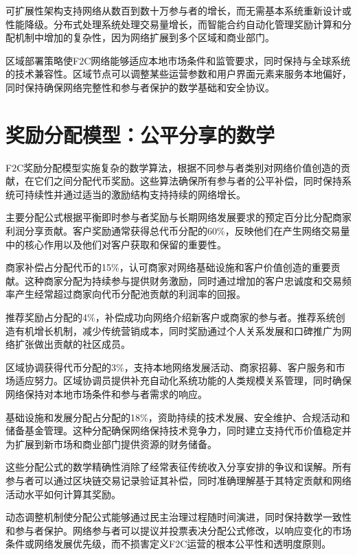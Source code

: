 \documentclass[
  Letterpaper,
]{scrbook}
\begin{document}
可扩展性架构支持网络从数百到数十万参与者的增长，而无需基本系统重新设计或性能降级。分布式处理系统处理交易量增长，而智能合约自动化管理奖励计算和分配机制中增加的复杂性，因为网络扩展到多个区域和商业部门。

区域部署策略使F2C网络能够适应本地市场条件和监管要求，同时保持与全球系统的技术兼容性。区域节点可以调整某些运营参数和用户界面元素来服务本地偏好，同时保持确保网络完整性和参与者保护的数学基础和安全协议。

\section{奖励分配模型：公平分享的数学}\label{ux5956ux52b1ux5206ux914dux6a21ux578bux516cux5e73ux5206ux4eabux7684ux6570ux5b66}

F2C奖励分配模型实施复杂的数学算法，根据不同参与者类别对网络价值创造的贡献，在它们之间分配代币奖励。这些算法确保所有参与者的公平补偿，同时保持系统可持续性并通过适当的激励结构支持持续的网络增长。

主要分配公式根据平衡即时参与者奖励与长期网络发展要求的预定百分比分配商家利润分享贡献。客户奖励通常获得总代币分配的60\%，反映他们在产生网络交易量中的核心作用以及他们对客户获取和保留的重要性。

商家补偿占分配代币的15\%，认可商家对网络基础设施和客户价值创造的重要贡献。这种商家分配为持续参与提供财务激励，同时通过增加的客户忠诚度和交易频率产生经常超过商家向代币分配池贡献的利润率的回报。

推荐奖励占分配的4\%，补偿成功向网络介绍新客户或商家的参与者。推荐系统创造有机增长机制，减少传统营销成本，同时奖励通过个人关系发展和口碑推广为网络扩张做出贡献的社区成员。

区域协调获得代币分配的3\%，支持本地网络发展活动、商家招募、客户服务和市场适应努力。区域协调员提供补充自动化系统功能的人类规模关系管理，同时确保网络保持对本地市场条件和参与者需求的响应。

基础设施和发展分配占分配的18\%，资助持续的技术发展、安全维护、合规活动和储备基金管理。这种分配确保网络保持技术竞争力，同时建立支持代币价值稳定并为扩展到新市场和商业部门提供资源的财务储备。

这些分配公式的数学精确性消除了经常表征传统收入分享安排的争议和误解。所有参与者可以通过区块链交易记录验证其补偿，同时准确理解基于其特定贡献和网络活动水平如何计算其奖励。

动态调整机制使分配公式能够通过民主治理过程随时间演进，同时保持数学一致性和参与者保护。网络参与者可以提议并投票表决分配公式修改，以响应变化的市场条件或网络发展优先级，而不损害定义F2C运营的根本公平性和透明度原则。
\end{document}
